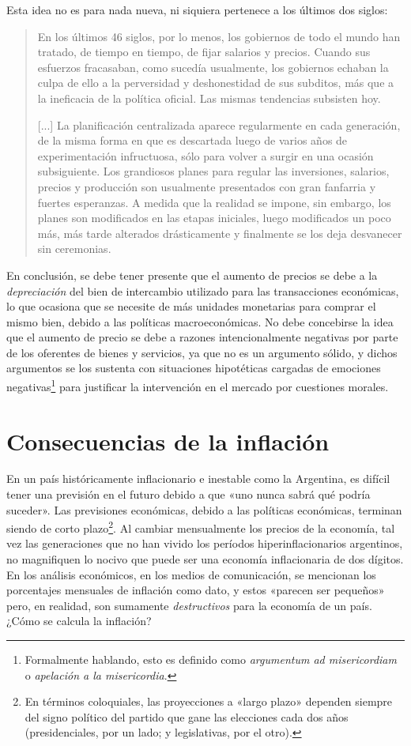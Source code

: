\documentclass[12pt,a4paper,twoside]{book}
\begin{document}
Esta idea no es para nada nueva, ni siquiera pertenece a los últimos dos siglos:

\begin{quotation}
En los últimos 46 siglos, por lo menos, los gobiernos de todo el mundo han tratado, de tiempo en tiempo, de fijar salarios y precios. Cuando sus esfuerzos fracasaban, como sucedía usualmente, los gobiernos echaban la culpa de ello a la perversidad y deshonestidad de sus subditos, más que a la ineficacia de la política oficial. Las mismas tendencias subsisten hoy.

[...] La planificación centralizada aparece regularmente en cada generación, de la misma forma en que es descartada luego de varios años de experimentación infructuosa, sólo para volver a surgir en una ocasión subsiguiente. Los grandiosos planes para regular las inversiones, salarios, precios y producción son usualmente presentados con gran fanfarria y fuertes esperanzas. A medida que la realidad se impone, sin embargo, los planes son modificados en las etapas iniciales, luego modificados un poco más, más tarde alterados drásticamente y finalmente se los deja desvanecer sin ceremonias. \cite[pág. 23]{4milanos}
\end{quotation}

En conclusión, se debe tener presente que el aumento de precios se debe a la \textit{depreciación} del bien de intercambio utilizado para las transacciones económicas, lo que ocasiona que se necesite de más unidades monetarias para comprar el mismo bien, debido a las políticas macroeconómicas. No debe concebirse la idea que el aumento de precio se debe a razones intencionalmente negativas por parte de los oferentes de bienes y servicios, ya que no es un argumento sólido, y dichos argumentos se los sustenta con situaciones hipotéticas cargadas de emociones negativas\footnote{Formalmente hablando, esto es definido como \textit{argumentum ad misericordiam} o \textit{apelación a la misericordia}.} para justificar la intervención en el mercado por cuestiones morales.

\section{Consecuencias de la inflación}
En un país históricamente inflacionario e inestable como la Argentina, es difícil tener una previsión en el futuro debido a que «uno nunca sabrá qué podría suceder». Las previsiones económicas, debido a las políticas económicas, terminan siendo de corto plazo\footnote{En términos coloquiales, las proyecciones a «largo plazo» dependen siempre del signo político del partido que gane las elecciones cada dos años (presidenciales, por un lado; y legislativas, por el otro).}. Al cambiar mensualmente los precios de la economía, tal vez las generaciones que no han vivido los períodos hiperinflacionarios argentinos, no magnifiquen lo nocivo que puede ser una economía inflacionaria de dos dígitos. En los análisis económicos, en los medios de comunicación, se mencionan los porcentajes mensuales de inflación como dato, y estos «parecen ser pequeños» pero, en realidad, son sumamente \textit{destructivos} para la economía de un país. ¿Cómo se calcula la inflación?
\end{document}

